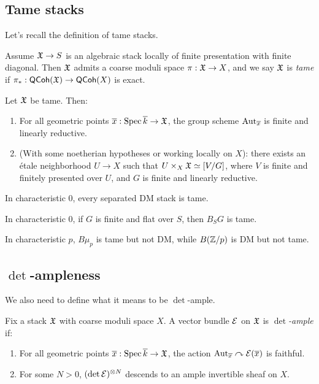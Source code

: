\documentclass{amsart}
\begin{document}
\subsection{Tame stacks}

Let's recall the definition of tame stacks.

\begin{dfn}
	Assume $\mathfrak{X} \to S$ is an algebraic stack locally of finite presentation with finite diagonal.
	Then $\mathfrak{X}$ admits a coarse moduli space $\pi: \mathfrak{X} \to X$, and we say $\mathfrak{X}$ is \emph{tame} if $\pi_*: \mathsf{QCoh}(\mathfrak{X}) \to \mathsf{QCoh}(X)$ is exact.
\end{dfn}

\begin{prop}
	Let $\mathfrak{X}$ be tame.
	Then:
	\begin{enumerate}
		\item For all geometric points $\overline{x}: \operatorname{Spec} \overline{k} \to \mathfrak{X}$, the group scheme $\operatorname{Aut}_{\overline{x}}$ is finite and linearly reductive.
		\item (With some noetherian hypotheses or working locally on $X$): there exists an \'etale neighborhood $U \to X$ such that $U \times_X \mathfrak{X} \simeq [V / G]$, where $V$ is finite and finitely presented over $U$, and $G$ is finite and linearly reductive.
	\end{enumerate}
\end{prop}

\begin{ex}
	In characteristic 0, every separated DM stack is tame.
\end{ex}

\begin{ex}
	In characteristic 0, if $G$ is finite and flat over $S$, then $B_S G$ is tame.
\end{ex}

\begin{ex}
	In characteristic $p$, $B \mu_p$ is tame but not DM, while $B(\mathbb{Z} / p)$ is DM but not tame.
\end{ex}

\subsection{$\det$-ampleness}

We also need to define what it means to be $\det$-ample.

\begin{dfn}
	Fix a stack $\mathfrak{X}$ with coarse moduli space $X$.
	A vector bundle $\mathcal{E}$ on $\mathfrak{X}$ is \emph{$\det$-ample} if:
	\begin{enumerate}
		\item For all geometric points $\overline{x}: \operatorname{Spec} \overline{k} \to \mathfrak{X}$, the action $\operatorname{Aut}_{\overline{x}} \curvearrowright \mathcal{E}(\overline{x})$ is faithful.
		\item For some $N > 0$, $(\det \mathcal{E})^{\otimes N}$ descends to an ample invertible sheaf on $X$.
	\end{enumerate}
\end{dfn}
\end{document}
